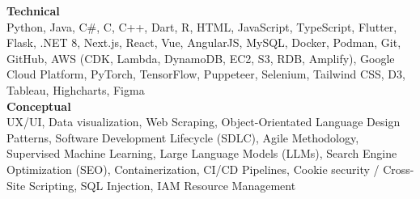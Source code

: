 \textbf{Technical}\\
Python, Java, C\#, C, C++, Dart, R, HTML, JavaScript, TypeScript, Flutter, Flask, .NET 8, Next.js, React, Vue, AngularJS, MySQL, Docker, Podman, Git, GitHub, AWS (CDK, Lambda, DynamoDB, EC2, S3, RDB, Amplify), Google Cloud Platform, PyTorch, TensorFlow, Puppeteer, Selenium, Tailwind CSS, D3, Tableau, Highcharts, Figma\\
\textbf{Conceptual}\\
UX/UI, Data visualization, Web Scraping, Object-Orientated Language Design Patterns, Software Development Lifecycle (SDLC), Agile Methodology, Supervised Machine Learning, Large Language Models (LLMs), Search Engine Optimization (SEO), Containerization, CI/CD Pipelines, Cookie security / Cross-Site Scripting, SQL Injection, IAM Resource Management\\